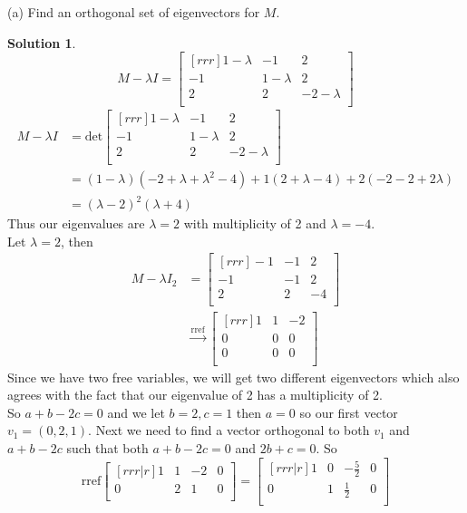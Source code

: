 \documentclass[12pt]{article}
\theoremstyle{definition}
\newtheorem*{solution}{Solution} %
\theoremstyle{plain}
\begin{document}
(a) Find an orthogonal set of eigenvectors for $M$.
\begin{solution}
\[ M-\lambda I = \begin{bmatrix}[rrr]1-\lambda&-1&2\\-1&1-\lambda&2\\2&2&-2-\lambda\\\end{bmatrix} \]
\begin{align*}
M-\lambda I &= \mathrm{det}\begin{bmatrix}[rrr]1-\lambda&-1&2\\-1&1-\lambda&2\\2&2&-2-\lambda\\\end{bmatrix}\\
&= (1-\lambda)(-2+\lambda+\lambda^2-4) +1(2+\lambda - 4) + 2(-2-2+2\lambda)\\
&= (\lambda-2)^2(\lambda+4)
\end{align*}
Thus our eigenvalues are $\lambda=2$ with multiplicity of 2 and $\lambda=-4$.\\
Let $\lambda=2$, then
\begin{align*}
M - \lambda I_2 &= \begin{bmatrix}[rrr]-1&-1&2\\-1&-1&2\\2&2&-4\\\end{bmatrix}\\
&\xrightarrow[]{\mathrm{rref}} \begin{bmatrix}[rrr]1&1&-2\\0&0&0\\0&0&0\\\end{bmatrix}
\end{align*}
Since we have two free variables, we will get two different eigenvectors which also agrees with the fact that our eigenvalue of 2 has a multiplicity of 2.\\
So $a+b-2c=0$ and we let $b=2,c=1$ then $a=0$ so our first vector $v_1=(0,2,1)$. Next we need to find a vector orthogonal to both $v_1$ and $a+b-2c$ such that both $a+b-2c=0$ and $2b+c=0$. So
\[ \mathrm{rref}\begin{bmatrix}[rrr|r]1&1&-2&0\\0&2&1&0\\\end{bmatrix} = \begin{bmatrix}[rrr|r]1&0&-\frac{5}{2}&0\\0&1&\frac{1}{2}&0\\\end{bmatrix} \]

\end{solution}
\end{document}
